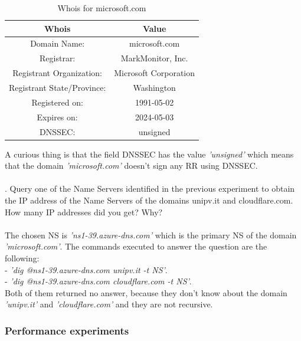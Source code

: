 \documentclass[a4paper,10pt]{article}
\begin{document}
\begin{multicols}{2}
        \begin{table}[H]
                \centering
                \caption{\small Whois for microsoft.com}
                \vspace{0.3cm}
                \begin{tabular}{|c|c|}
                \hline
                \textbf{Whois} & \textbf{Value} \\ \hline
                Domain Name: & microsoft.com \\ \hline
                Registrar: & MarkMonitor, Inc. \\ \hline
                Registrant Organization: & Microsoft Corporation \\ \hline
                Registrant State/Province: & Washington \\ \hline
                Registered on: & 1991-05-02 \\ \hline
                Expires on: & 2024-05-03 \\ \hline
                DNSSEC: & unsigned \\ \hline
                \end{tabular}
                \label{tab:quest_4_whois}
        \end{table}
\noindent
A curious thing is that the field DNSSEC has the value \textit{'unsigned'} which means that the domain \textit{'microsoft.com'} doesn't sign any RR using DNSSEC.\\
\\
. Query one of the Name Servers identified in the previous experiment to obtain the IP address of the Name Servers of the domains unipv.it and 
cloudflare.com. How many IP addresses did you get? Why?\\
\\
The chosen NS is \textit{'ns1-39.azure-dns.com'} which is the primary NS of the domain \textit{'microsoft.com'}. The commands executed to answer the question are the following:\\
- \textit{'dig @ns1-39.azure-dns.com unipv.it -t NS'}.\\
- \textit{'dig @ns1-39.azure-dns.com cloudflare.com -t NS'}.\\
Both of them returned no answer, because they don't know about the domain \textit{'unipv.it'} and \textit{'cloudflare.com'} and they are not recursive.\\




\subsubsection*{Performance experiments}


\end{multicols}
\end{document}
